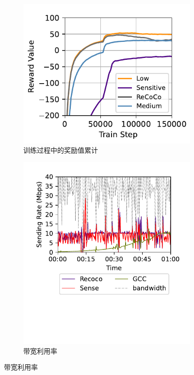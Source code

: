 \begin{figure}[!ht]
\centering
\begin{subfigure}[t]{0.5\linewidth}
  \centering
  \includegraphics[width=\linewidth]{figures/chap03/evaluation_plots/reward_value.pdf}
  \caption{训练过程中的奖励值累计}
  \label{fig-reward-func}
\end{subfigure}%
\begin{subfigure}[t]{0.5\linewidth}
  \centering
  \includegraphics[width=\linewidth]{figures/chap03/evaluation_plots/bandwidth.pdf}
  \caption{带宽利用率}
  \label{fig-band-util}
\end{subfigure}


\end{figure}
